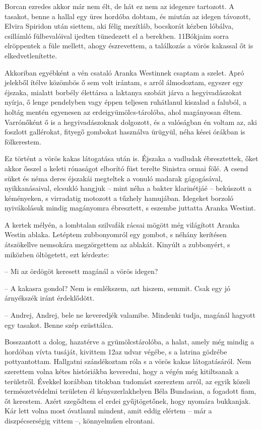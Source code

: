 \documentclass{IEEEtran}
\begin{document}
Borcan ezredes akkor már nem élt, de hát ez nem az idegenre tartozott. A
tasakot, benne a hallal egy üres hordóba dobtam, és miután az idegen távozott,
Elvira Spiridon után siettem, aki félig mezítláb, bocskorát kézben lóbálva,
csillámló fülbevalóival ijedten tünedezett el a berekben. 11Bókjaim sorra
elröppentek a füle mellett, ahogy észrevettem, a találkozás a vörös kakassal
őt is elkedvetlenítette.

Akkoriban egyébként a vén csataló Aranka Westinnek csaptam a szelet. Apró
jelekből ítélve közömbös ő sem volt irántam, s arról álmodoztam, egyszer egy
éjszaka, mialatt borbély élettársa a laktanya szobáit járva a hegyivadászokat
nyírja, ő lenge pendelyben vagy éppen teljesen ruhátlanul kiszalad a faluból,
a holtág mentén egyenesen az erdeigyümölcs-tárolóba, ahol magányosan éltem.
Varrónőként ő is a hegyivadászoknak dolgozott, és a valóságban én voltam az,
aki foszlott gallérokat, fityegő gombokat használva ürügyül, néha kései
órákban is fölkerestem.

Ez történt a vörös kakas látogatása után is. Éjszaka a vadludak ébresztettek,
őket akkor ősszel a keleti rónaságot elborító füst terelte Sinistra ormai
fölé. A csend süket és néma deres éjszakái megteltek a vonuló madarak
gágogásával, nyikkanásaival, elcsukló hangjuk – mint néha a bakter klarinétjáé
– bekúszott a kéményeken, s virradatig motozott a tűzhely hamujában. Idegeket
borzoló nyivákolásuk mindig magányomra ébresztett, s eszembe juttatta Aranka
Westint.

A kertek mélyén, a lombtalan szilvafák rácsai mögött még világított Aranka
Westin ablaka. Letéptem zubbonyomról egy gombot, s néhány kerítésen
átszökellve nemsokára megzörgettem az ablakát. Kinyúlt a zubbonyért, s
miközben öltögetett, ezt kérdezte:

– Mi az ördögöt keresett magánál a vörös idegen?

– A kakasra gondol? Nem is emlékszem, azt hiszem, semmit. Csak egy jó
árnyékszék iránt érdeklődött.

– Andrej, Andrej, bele ne keveredjék valamibe. Mindenki tudja, magánál hagyott
egy tasakot. Benne szép ezüsttálca.

Bosszantott a dolog, hazatérve a gyümölcstárolóba, a halat, amely még mindig a
hordóban vívta tusáját, kivittem 12az udvar végébe, s a latrina gödrébe
pottyantottam. Hallgatni szándékoztam róla s a vörös kakas látogatásáról. Nem
szerettem volna kétes históriákba keveredni, hogy a végén még kitiltsanak a
területről. Évekkel korábban titokban tudomást szereztem arról, az egyik
közeli természetvédelmi területen él kényszerlakhelyen Béla Bundasian, a
fogadott fiam, őt kerestem. Azért szegődtem el erdei gyűjtögetőnek, hogy
nyomára bukkanjak. Kár lett volna most óvatlanul mindent, amit eddig elértem –
már a diszpécserségig vittem –, könnyelműen elrontani.
\end{document}
